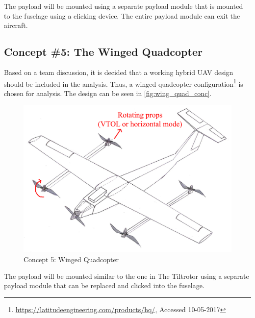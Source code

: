 The payload will be mounted using a separate payload module that is mounted to the fuselage using a clicking device. The entire payload module can exit the aircraft.




\subsection{Concept \#5: The Winged Quadcopter}
Based on a team discussion, it is decided that a working hybrid UAV design should be included in the analysis. Thus, a winged quadcopter configuration\footnote{\url{https://latitudeengineering.com/products/hq/}, Accessed 10-05-2017} is chosen for analysis. The design can be seen in \autoref{fig:wing_quad_conc}.


\begin{figure}[htb]
    \centering
    \includegraphics[width=.475\textwidth]{Concepts/Figures/WingedQuadcopter}
    \caption{Concept 5: Winged Quadcopter}
    \label{fig:wing_quad_conc}
\end{figure}

The payload will be mounted similar to the one in The Tiltrotor using a separate payload module that can be replaced and clicked into the fuselage.
